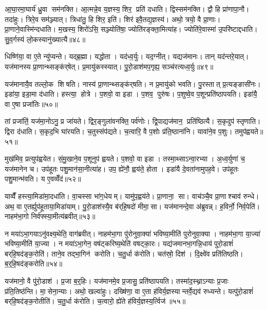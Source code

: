 आ॒घा॒रमा॒घार्य॑ ध्रु॒वा सम॑नक्ति। आ॒त्मन्ने॒व य॒ज्ञस्य॒ शिर॒ प्रति॑ दधाति। द्विस्सम॑नक्ति। द्वौ हि प्रा॑णापा॒नौ। तदा॑हुः। त्रिरे॒व सम॑ञ्ज्यात्। त्रिधा॑तु॒ हि शिर॒ इति॑। शिर॑ इवै॒तद्य॒ज्ञस्य॑। अथो॒ त्रयो॒ वै प्रा॒णाः। प्रा॒णाने॒वास्मि॑न्दधाति। म॒खस्य॒ शिरो॑ऽसि॒ सञ्ज्योति॑षा॒ ज्योति॑रङ्क्ता॒मित्या॑ह। ज्योति॑रे॒वास्मा॑ उ॒परि॑ष्टाद्दधाति। सु॒व॒र्गस्य॑ लो॒कस्यानु॑ख्यात्यै॥४८॥\anuvakamend[परि॑दधाति प्रा॒णन्द॑धाति॒ हि य॒ज्ञो घा॑रयति॒ नम॒ इत्या॑ह प॒श्चाद्वी॒र्या॑णीत्या॑ह॒ भा इत्या॑ह भ॒जेत्या॑ह ध्रु॒वैवास्मि॑न्दधाति॒ त्रीणि॑ च]

धिष्णि॑या॒ वा ए॒ते न्यु॑प्यन्ते। यद्ब्र॒ह्मा। यद्धोता। यद॑ध्व॒र्युः। यद॒ग्नीत्। यद्यज॑मानः। तान् यद॑न्तरे॒यात्। यज॑मानस्य प्रा॒णान्थ्सङ्क॑र्‌षेत्। प्र॒मायु॑कस्स्यात्। पु॒रो॒डाश॑मप॒गृह्य॒ सञ्च॑रत्यध्व॒र्युः॥४९॥

यज॑मानायै॒व तल्लो॒क शिषति। नास्य॑ प्रा॒णान्थ्सङ्क॑र्‌षति। न प्र॒मायु॑को भवति। पु॒रस्तात् प्र॒त्यङ्ङासी॑नः। इडा॑या॒ इडा॒मा द॑धाति। हस्त्या॒ होत्रे। प॒शवो॒ वा इडा। प॒शव॒ पुरु॑षः। प॒शुष्वे॒व प॒शून्प्रति॑ष्ठापयति। इडा॑यै॒ वा ए॒षा प्रजा॑तिः॥५०॥

तां प्रजा॑तिं॒ यज॑मा॒नोऽनु॒ प्र जा॑यते। द्विर॒ङ्गुला॑वनक्ति॒ पर्व॑णोः। द्वि॒पाद्यज॑मान॒ प्रति॑ष्ठित्यै। स॒कृदुप॑ स्तृणाति। द्विरा द॑धाति। स॒कृद॒भि घा॑रयति। च॒तुस्संप॑द्यते। च॒त्वारि॒ वै प॒शोः प्र॑ति॒ष्ठाना॑नि। यावा॑ने॒व प॒शुः। तमुप॑ह्वयते॥५१॥

मुख॑मिव॒ प्रत्युप॑ह्वयेत। सं॒मु॒खाने॒व प॒शूनुप॑ ह्वयते। प॒शवो॒ वा इडा। तस्मा॒थ्साऽन्वा॒रभ्या। अ॒ध्व॒र्युणा॑ च॒ यज॑मानेन च। उप॑हूतः पशु॒मान॑सा॒नीत्या॑ह। उप॒ ह्ये॑नौ॒ ह्वय॑ते॒ होता। इडा॑यै दे॒वता॑नामुपह॒वे। उप॑हूतः पशु॒मान्भ॑वति। य ए॒वव्वेँद॑॥५२॥

याव्वैँ हस्त्या॒मिडा॑मा॒दधा॑ति। वा॒चस्सा भा॑ग॒धेयम्। यामु॑प॒ह्वय॑ते। प्रा॒णाना॒ सा। वाच॑ञ्चै॒व प्रा॒णाश्चाव॑ रुन्धे। अथ॒ वा ए॒तर्ह्युप॑हूताया॒मिडा॑याम्। पु॒रो॒डाश॑स्यै॒व ब॑र्‌हि॒षदो॑ मीमा॒सा। यज॑मानन्दे॒वा अ॑ब्रुवन्न्। ह॒विर्नो॒ निर्व॒पेति॑। नाहम॑भा॒गो निर्व॑फ्स्या॒मीत्य॑ब्रवीत्॥५३॥

न मया॑ऽभा॒गयाऽनु॑वक्ष्य॒थेति॒ वाग॑ब्रवीत्। नाहम॑भा॒गा पु॑रोनुवा॒क्या॑ भविष्या॒मीति॑ पुरोनुवा॒क्या। नाहम॑भा॒गा या॒ज्या॑ भविष्या॒मीति॑ या॒ज्या। न मया॑ऽभा॒गेन॒ वष॑ट्करिष्य॒थेति॑ वषट्का॒रः। यद्य॑जमानभा॒गन्नि॒धाय॑ पुरो॒डाशं॑ बर्‌हि॒षद॑ङ्क॒रोति॑। ताने॒व तद्भा॒गिन॑ करोति। च॒तु॒र्धा क॑रोति। चत॑स्रो॒ दिश॑। दि॒क्ष्वे॑व प्रति॑तिष्ठति। ब॒र्॒हि॒षद॑ङ्करोति॥५४॥

यज॑मानो॒ वै पु॑रो॒डाश॑। प्र॒जा ब॒र्॒हिः। यज॑मानमे॒व प्र॒जासु॒ प्रति॑ष्ठापयति। तस्मा॑द॒स्थ्नाऽन्याः प्र॒जाः प्र॑ति॒तिष्ठ॑न्ति। मा॒सेना॒न्याः। अथो॒ खल्वा॑हुः। दख्षि॑णा॒ वा ए॒ता ह॑विर्य॒ज्ञस्यान्तर्वे॒द्यव॑ रुध्यन्ते। यत्पु॑रो॒डाशं॑ बर्‌हि॒षद॑ङ्क॒रोतीति॑। च॒तु॒र्धा क॑रोति। च॒त्वारो॒ ह्ये॑ते ह॑विर्य॒ज्ञस्य॒र्त्विज॑॥५५॥

